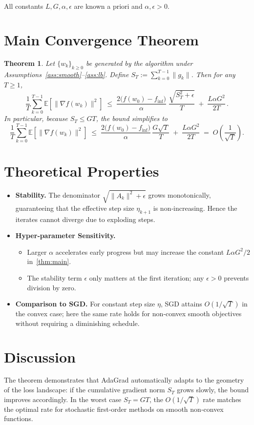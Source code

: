 \documentclass{article}
\newtheorem{theorem}{Theorem}
\newcommand{\E}{\mathbb{E}}
\begin{document}
All constants $L,G,\alpha,\epsilon$ are known a priori and $\alpha,\epsilon>0$.

\section*{Main Convergence Theorem}
\begin{theorem}\label{thm:main}
Let $\{w_k\}_{k\ge0}$ be generated by the algorithm under
Assumptions~\ref{ass:smooth}–\ref{ass:lb}.
Define $S_T:=\sum_{k=0}^{T-1}\|g_k\|$.
Then for any $T\ge 1$,
\[
\frac{1}{T}\sum_{k=0}^{T-1}\E\!\left[\|\nabla f(w_k)\|^2\right]
\;\le\;
\frac{2\bigl(f(w_0)-f_{\inf}\bigr)}{\alpha}
\;\frac{\sqrt{S_T^2+\epsilon}}{T}
\;+\;
\frac{L\alpha G^2}{2T}\, .
\tag{1}
\]
In particular, because $S_T\le G T$, the bound simplifies to
\[
\frac{1}{T}\sum_{k=0}^{T-1}\E\!\left[\|\nabla f(w_k)\|^2\right]
\;\le\;
\frac{2\bigl(f(w_0)-f_{\inf}\bigr)}{\alpha}\,
\frac{G\sqrt{T}}{T}
\;+\;
\frac{L\alpha G^2}{2T}
\;=\;
O\!\left(\frac{1}{\sqrt{T}}\right).
\]
\end{theorem}

\section*{Theoretical Properties}
\begin{itemize}[leftmargin=*]
\item \textbf{Stability.} The denominator $\sqrt{\|A_k\|^2+\epsilon}$ grows
monotonically, guaranteeing that the effective step size $\eta_{k+1}$
is non‑increasing. Hence the iterates cannot diverge due to exploding
steps.
\item \textbf{Hyper‑parameter Sensitivity.}
    \begin{itemize}
    \item Larger $\alpha$ accelerates early progress but may increase the
    constant $L\alpha G^2/2$ in~\eqref{thm:main}.
    \item The stability term $\epsilon$ only matters at the first iteration;
    any $\epsilon>0$ prevents division by zero.
    \end{itemize}
\item \textbf{Comparison to SGD.} For constant step size $\eta$, SGD attains
$O(1/\sqrt{T})$ in the convex case; here the same rate holds for non‑convex
smooth objectives without requiring a diminishing schedule.
\end{itemize}

\section*{Discussion}
The theorem demonstrates that AdaGrad automatically adapts to the geometry of
the loss landscape: if the cumulative gradient norm $S_T$ grows slowly,
the bound improves accordingly. In the worst case $S_T=GT$, the
$O(1/\sqrt{T})$ rate matches the optimal rate for stochastic first‑order
methods on smooth non‑convex functions.
\end{document}
